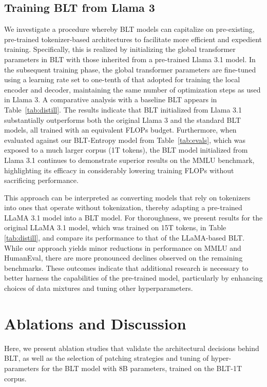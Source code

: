 \subsection{Training {\textsc BLT} from Llama 3}
\label{sec:distillation}
We investigate a procedure whereby {\textsc BLT} models can capitalize on pre-existing, pre-trained tokenizer-based architectures to facilitate more efficient and expedient training. Specifically, this is realized by initializing the global transformer parameters in {\textsc BLT} with those inherited from a pre-trained Llama 3.1 model. In the subsequent training phase, the global transformer parameters are fine-tuned using a learning rate set to one-tenth of that adopted for training the local encoder and decoder, maintaining the same number of optimization steps as used in Llama 3. A comparative analysis with a baseline {\textsc BLT} appears in Table~\ref{tab:distill}. The results indicate that {\textsc BLT} initialized from Llama 3.1 substantially outperforms both the original Llama 3 and the standard {\textsc BLT} models, all trained with an equivalent FLOPs budget. Furthermore, when evaluated against our {\textsc BLT}-Entropy model from Table~\ref{tab:evals}, which was exposed to a much larger corpus (1T tokens), the {\textsc BLT} model initialized from Llama 3.1 continues to demonstrate superior results on the MMLU benchmark, highlighting its efficacy in considerably lowering training FLOPs without sacrificing performance.

This approach can be interpreted as converting models that rely on tokenizers into ones that operate without tokenization, thereby adapting a pre-trained LLaMA 3.1 model into a {\textsc BLT} model. For thoroughness, we present results for the original LLaMA 3.1 model, which was trained on 15T tokens, in Table \ref{tab:distill}, and compare its performance to that of the LLaMA-based {\textsc BLT}. While our approach yields minor reductions in performance on MMLU and HumanEval, there are more pronounced declines observed on the remaining benchmarks. These outcomes indicate that additional research is necessary to better harness the capabilities of the pre-trained model, particularly by enhancing choices of data mixtures and tuning other hyperparameters.

\section{Ablations and Discussion}
\label{section:ablations}
Here, we present ablation studies that validate the architectural decisions behind {\textsc BLT}, as well as the selection of patching strategies and tuning of hyper-parameters for the {\textsc BLT} model with 8B parameters, trained on the {\textsc BLT}-1T corpus.

